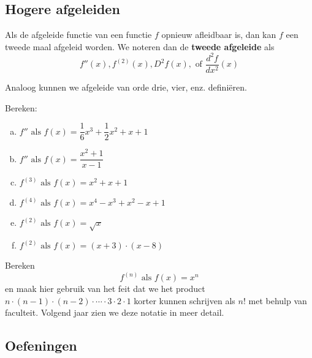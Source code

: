 \documentclass[a4paper,12pt,twoside]{article}
\begin{document}
\subsection{Hogere afgeleiden}

Als de afgeleide functie van een functie $f$ opnieuw afleidbaar is, dan kan $f$ een tweede maal afgeleid worden. We noteren dan de {\bf tweede afgeleide} als
$$f''(x), f^{(2)}(x), D^2f(x), \mbox{ of } \dfrac{d^2f}{dx^2}(x)$$

Analoog kunnen we afgeleide van orde drie, vier, enz. definiëren.

\begin{oefening}
  Bereken:
  \begin{multicols}{2}
  \begin{enumerate}[(a)]
  \itemsep1em
  \item $f'' \mbox{ als } f(x)=\dfrac{1}{6}x^3+\dfrac{1}{2}x^2+x+1$
  \item $f'' \mbox{ als } f(x)=\dfrac{x^2+1}{x-1}$
  \item $f^{(3)} \mbox{ als } f(x)=x^2+x+1$
  \item $f^{(4)} \mbox{ als } f(x)=x^4-x^3+x^2-x+1$
  \item $f^{(2)} \mbox{ als } f(x)=\sqrt{x}$
  \item $f^{(2)} \mbox{ als } f(x)=(x+3)\cdot(x-8)$
  \end{enumerate}
  \end{multicols}
\end{oefening}

\begin{oefening}
Bereken
$$f^{(n)} \mbox{ als } f(x)=x^n$$
en maak hier gebruik van het feit dat we het product $n\cdot(n-1)\cdot(n-2)\cdot \cdots \cdot 3\cdot 2\cdot 1$ korter kunnen schrijven als $n!$ met behulp van faculteit. Volgend jaar zien we deze notatie in meer detail.
\end{oefening}

\needspace{3cm}
\subsection{Oefeningen}
\end{document}
